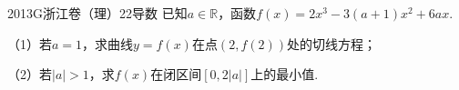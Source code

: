 
\begin{problem}{2013}{G}{浙江卷（理）}{22}{导数}
已知$a\in\mathbb{R}$，函数$f(x)=2x^3-3(a+1)x^2+6ax$.

（1）若$a=1$，求曲线$y=f(x)$在点$(2,f(2))$处的切线方程；

（2）若$|a|>1$，求$f(x)$在闭区间$[0,2|a|]$上的最小值.
\end{problem}